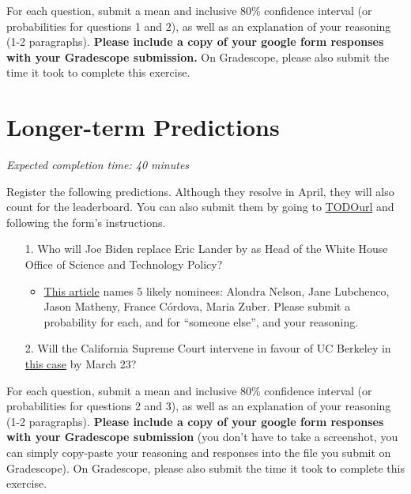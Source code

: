 \documentclass[11pt]{article}
\begin{document}
For each question, submit a mean and inclusive 80\% confidence interval (or probabilities for questions 1 and 2), as well as an explanation of your reasoning (1-2 paragraphs). \textbf{Please include a copy of your google form responses with your Gradescope submission.} On Gradescope, please also submit the time it took to complete this exercise.

\section*{Longer-term Predictions}

\emph{Expected completion time: 40 minutes}

Register the following predictions. Although they resolve in April, they will also count for the leaderboard. You can also submit them by going to \url{TODOurl} and following the form's instructions.


\begin{enumerate}
	\item[1.] Who will Joe Biden replace Eric Lander by as Head of the White House Office of Science and Technology Policy?
	\begin{itemize}
		\item \href{https://www.politico.com/newsletters/morning-tech/2022/02/09/the-race-to-replace-lander-at-ostp-00007114}{This article} names 5 likely nominees: Alondra Nelson, Jane Lubchenco, Jason Matheny, France Córdova, Maria Zuber. Please submit a probability for each, and for ``someone else'', and your reasoning.
	\end{itemize} 
	\item[2.] Will the California Supreme Court intervene in favour of UC Berkeley in \href{https://www.berkeleyside.org/2022/02/14/uc-berkeley-enrollment-drop-court-of-appeal-ruling}{this case} by March 23?
\end{enumerate}

For each question, submit a mean and inclusive 80\% confidence interval (or probabilities for questions 2 and 3), as well as an explanation of your reasoning (1-2 paragraphs). \textbf{Please include a copy of your google form responses with your Gradescope submission} (you don't have to take a screenshot, you can simply copy-paste your reasoning and responses into the file you submit on Gradescope). On Gradescope, please also submit the time it took to complete this exercise.

\end{document}
